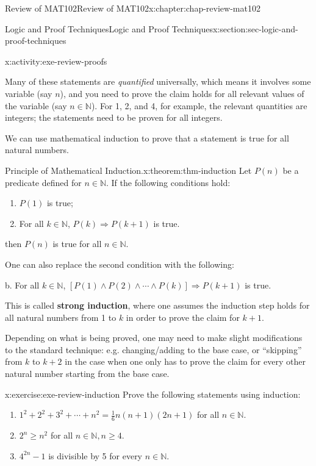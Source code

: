 \documentclass[oneside,10pt,]{book}
\newcommand{\terminology}[1]{\textbf{#1}}
\numberwithin{equation}{section}
\begin{document}
\begin{chapterptx}{Review of MAT102}{}{Review of MAT102}{}{}{x:chapter:chap-review-mat102}
\begin{sectionptx}{Logic and Proof Techniques}{}{Logic and Proof Techniques}{}{}{x:section:sec-logic-and-proof-techniques}
\begin{activity}{}{x:activity:exe-review-proofs}
\begin{enumerate}[label=(\alph*)]
\end{enumerate}
%
\end{activity}
Many of these statements are \emph{quantified} universally, which means it involves some variable (say \(n\)), and you need to prove the claim holds for all relevant values of the variable (say \(n \in \mathbb{N}\)). For 1, 2, and 4, for example, the relevant quantities are integers; the statements need to be proven for all integers.%
\par
We can use mathematical induction to prove that a statement is true for all natural numbers.%
\begin{theorem}{Principle of Mathematical Induction.}{}{x:theorem:thm-induction}%
Let \(P(n)\) be a predicate defined for \(n \in \mathbb{N}\). If the following conditions hold:%
\begin{enumerate}[label=(\alph*)]
\item{}\(P(1)\) is true;%
\item{}For all \(k \in \mathbb{N}\), \(P(k) \Rightarrow P(k+1)\) is true.%
\end{enumerate}
then \(P(n)\) is true for all \(n \in \mathbb{N}\).%
\par
One can also replace the second condition with the following:%
\par
b.\textasteriskcentered{} For all \(k \in \mathbb{N}\), \([P(1) \wedge P(2) \wedge \cdots \wedge P(k)] \Rightarrow P(k+1)\) is true.%
\par
This is called \terminology{strong induction}, where one assumes the induction step holds for all natural numbers from 1 to \(k\) in order to prove the claim for \(k+1\).%
\end{theorem}
Depending on what is being proved, one may need to make slight modifications to the standard technique: e.g. changing\slash{}adding to the base case, or ``skipping'' from \(k\) to \(k+2\) in the case when one only has to prove the claim for every other natural number starting from the base case.%
\begin{inlineexercise}{}{x:exercise:exe-review-induction}%
Prove the following statements using induction:%
%
\begin{enumerate}[label=(\alph*)]
\item{}\(1^2 + 2^2 + 3^2 + \cdots + n^2 = \frac{1}{6}n(n+1)(2n+1)\) for all \(n \in \mathbb{N}\).%
\item{}\(2^n \geq n^2\) for all \(n \in \mathbb{N}, n \geq 4\).%
\item{}\(4^{2n} -1\) is divisible by 5 for every \(n \in \mathbb{N}\).%

\end{enumerate}
\end{inlineexercise}
\end{sectionptx}
\end{chapterptx}
\end{document}
